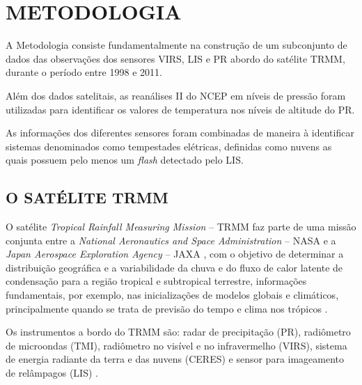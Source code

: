 \chapter{METODOLOGIA}
\label{metodologia}

A Metodologia consiste fundamentalmente na construção de um subconjunto de dados das observações dos sensores VIRS, LIS e PR abordo do satélite TRMM, durante o período entre 1998 e 2011. 

Além dos dados satelitais, as reanálises II do NCEP  em níveis de pressão foram utilizadas para identificar os valores de temperatura nos níveis de altitude do PR.

As informações dos diferentes sensores foram combinadas de maneira à identificar sistemas denominados como tempestades elétricas, definidas como nuvens as quais possuem pelo menos um \textit{flash} detectado pelo LIS. 


\section{O SATÉLITE TRMM}

O satélite \textit{Tropical Rainfall Measuring Mission} -- TRMM  faz parte de uma missão conjunta entre a \textit{National Aeronautics and Space Administration} -- NASA e  a \textit{Japan Aerospace Exploration Agency} -- JAXA , com o objetivo de determinar a distribuição geográfica e a variabilidade da chuva e do fluxo de calor latente de condensação para a região tropical e subtropical terrestre, informações fundamentais, por exemplo, nas inicializações de modelos globais e climáticos, principalmente quando se trata de previsão do tempo e clima nos trópicos \cite{kummerok1998,simpson1988}.
  
Os instrumentos a bordo do TRMM são: radar de precipitação (PR), radiômetro de microondas (TMI), radiômetro no visível e no infravermelho (VIRS), sistema de energia radiante da terra e das nuvens (CERES) e sensor para imageamento de relâmpagos (LIS) \cite{kummerok1998}.

